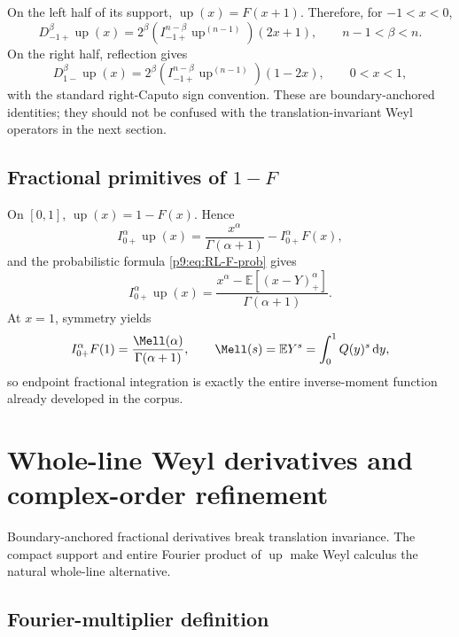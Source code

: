 \documentclass[11pt,oneside]{article}
\theoremstyle{definition}
\theoremstyle{remark}
\newcommand{\Up}{\operatorname{up}}
\newcommand{\E}{\mathbb E}
\newcommand{\dd}{\,\mathrm d}
\newcommand{\1}{\mathbf 1}
\begin{document}
On the left half of its support, $\Up(x)=F(x+1)$.  Therefore, for
$-1<x<0$,
\begin{equation}
 D_{-1+}^\beta\Up(x)
 =2^\beta
  \left(I_{-1+}^{n-\beta}\Up^{(n-1)}\right)(2x+1),
 \qquad n-1<\beta<n.
 \label{p9:eq:up-left-fractional}
\end{equation}
On the right half, reflection gives
\begin{equation}
 D_{1-}^\beta\Up(x)
 =2^\beta
  \left(I_{-1+}^{n-\beta}\Up^{(n-1)}\right)(1-2x),
 \qquad 0<x<1,
 \label{p9:eq:up-right-fractional}
\end{equation}
with the standard right-Caputo sign convention.  These are boundary-anchored
identities; they should not be confused with the translation-invariant Weyl
operators in the next section.

\subsection{Fractional primitives of \texorpdfstring{$1-F$}{1-F}}

On $[0,1]$, $\Up(x)=1-F(x)$.  Hence
\begin{equation}
 I_{0+}^\alpha\Up(x)
 =\frac{x^\alpha}{\Gamma(\alpha+1)}-I_{0+}^\alpha F(x),
 \label{p9:eq:half-up-RL}
\end{equation}
and the probabilistic formula \cref{p9:eq:RL-F-prob} gives
\begin{equation}
 I_{0+}^\alpha\Up(x)
 =\frac{x^\alpha-\E[(x-Y)_+^\alpha]}{\Gamma(\alpha+1)}.
 \label{p9:eq:half-up-truncated}
\end{equation}
At $x=1$, symmetry yields
\begin{equation}
 I_{0+}^\alpha F(1)
 =\frac{\Mell(\alpha)}{\Gamma(\alpha+1)},
 \qquad
 \Mell(s)=\E Y^s=\int_0^1Q(y)^s\dd y,
 \label{p9:eq:RL-endpoint-Mellin}
\end{equation}
so endpoint fractional integration is exactly the entire inverse-moment
function already developed in the corpus.

\section{Whole-line Weyl derivatives and complex-order refinement}
\label{p9:sec:Weyl}

Boundary-anchored fractional derivatives break translation invariance.  The
compact support and entire Fourier product of $\Up$ make Weyl calculus the
natural whole-line alternative.

\subsection{Fourier-multiplier definition}
\end{document}
